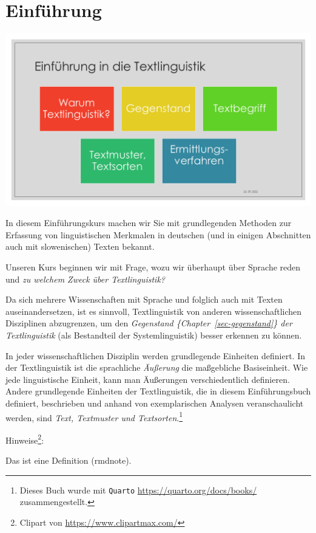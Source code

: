 \documentclass[
  letterpaper,
]{scrbook}
\begin{document}
\hypertarget{einfuxfchrung}{%
\chapter{Einführung}\label{einfuxfchrung}}

\includegraphics[width=1\textwidth,height=\textheight]{./pictures/Diapozitiv5.PNG}

In diesem Einführungskurs machen wir Sie mit grundlegenden Methoden zur
Erfassung von linguistischen Merkmalen in deutschen (und in einigen
Abschnitten auch mit slowenischen) Texten bekannt.

Unseren Kurs beginnen wir mit Frage, wozu wir überhaupt über Sprache
reden und \emph{zu welchem Zweck über Textlinguistik?}

Da sich mehrere Wissenschaften mit Sprache und folglich auch mit Texten
auseinandersetzen, ist es sinnvoll, Textlinguistik von anderen
wissenschaftlichen Disziplinen abzugrenzen, um den \emph{Gegenstand
\{Chapter~\ref{sec-gegenstand}\} der Textlinguistik} (als Bestandteil
der Systemlinguistik) besser erkennen zu können.

In jeder wissenschaftlichen Disziplin werden grundlegende Einheiten
definiert. In der Textlinguistik ist die sprachliche \emph{Äußerung} die
maßgebliche Basiseinheit. Wie jede linguistische Einheit, kann man
Äußerungen verschiedentlich definieren. Andere grundlegende Einheiten
der Textlinguistik, die in diesem Einführungsbuch definiert, beschrieben
und anhand von exemplarischen Analysen veranschaulicht werden, sind
\emph{Text, Textmuster und Textsorten}.\footnote{Dieses Buch wurde mit
  \texttt{Quarto} \url{https://quarto.org/docs/books/} zusammengestellt.}

Hinweise\footnote{Clipart von \url{https://www.clipartmax.com/}}:

Das ist eine Definition (rmdnote).
\end{document}
